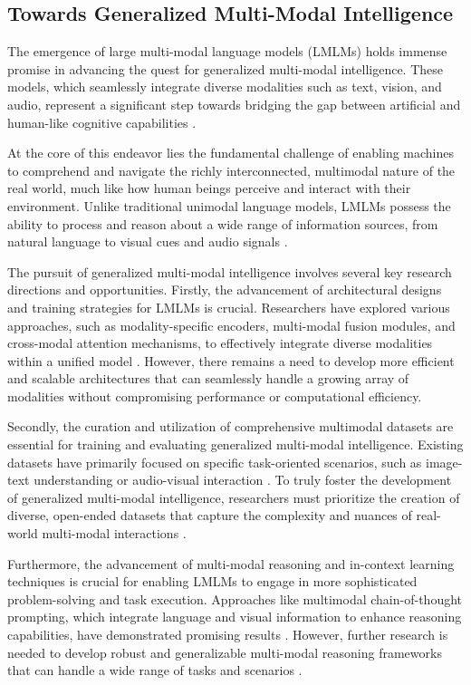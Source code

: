 \documentclass[11pt]{article}
\begin{document}
\subsection{Towards Generalized Multi-Modal Intelligence}

The emergence of large multi-modal language models (LMLMs) holds immense promise in advancing the quest for generalized multi-modal intelligence. These models, which seamlessly integrate diverse modalities such as text, vision, and audio, represent a significant step towards bridging the gap between artificial and human-like cognitive capabilities \cite{ref351,ref352,ref6}.

At the core of this endeavor lies the fundamental challenge of enabling machines to comprehend and navigate the richly interconnected, multimodal nature of the real world, much like how human beings perceive and interact with their environment. Unlike traditional unimodal language models, LMLMs possess the ability to process and reason about a wide range of information sources, from natural language to visual cues and audio signals \cite{ref353,ref221}.

The pursuit of generalized multi-modal intelligence involves several key research directions and opportunities. Firstly, the advancement of architectural designs and training strategies for LMLMs is crucial. Researchers have explored various approaches, such as modality-specific encoders, multi-modal fusion modules, and cross-modal attention mechanisms, to effectively integrate diverse modalities within a unified model \cite{ref6,ref354,ref17}. However, there remains a need to develop more efficient and scalable architectures that can seamlessly handle a growing array of modalities without compromising performance or computational efficiency.

Secondly, the curation and utilization of comprehensive multimodal datasets are essential for training and evaluating generalized multi-modal intelligence. Existing datasets have primarily focused on specific task-oriented scenarios, such as image-text understanding or audio-visual interaction \cite{ref353,ref351}. To truly foster the development of generalized multi-modal intelligence, researchers must prioritize the creation of diverse, open-ended datasets that capture the complexity and nuances of real-world multi-modal interactions \cite{ref355,ref356}.

Furthermore, the advancement of multi-modal reasoning and in-context learning techniques is crucial for enabling LMLMs to engage in more sophisticated problem-solving and task execution. Approaches like multimodal chain-of-thought prompting, which integrate language and visual information to enhance reasoning capabilities, have demonstrated promising results \cite{ref357,ref358}. However, further research is needed to develop robust and generalizable multi-modal reasoning frameworks that can handle a wide range of tasks and scenarios \cite{ref359,ref360}.
\end{document}
